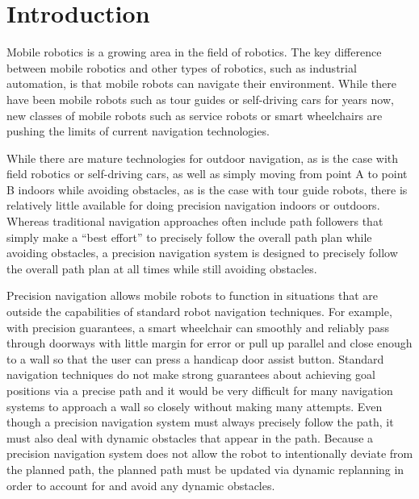 \section{Introduction}\label{sec:introduction}

Mobile robotics is a growing area in the field of robotics. The key difference between mobile robotics and other types of robotics, such as industrial automation, is that mobile robots can navigate their environment. While there have been mobile robots such as tour guides or self-driving cars for years now, new classes of mobile robots such as service robots or smart wheelchairs are pushing the limits of current navigation technologies.

While there are mature technologies for outdoor navigation, as is the case with field robotics or self-driving cars, as well as simply moving from point A to point B indoors while avoiding obstacles, as is the case with tour guide robots, there is relatively little available for doing precision navigation indoors or outdoors. Whereas traditional navigation approaches often include path followers that simply make a ``best effort'' to precisely follow the overall path plan while avoiding obstacles, a precision navigation system is designed to precisely follow the overall path plan at all times while still avoiding obstacles.

Precision navigation allows mobile robots to function in situations that are outside the capabilities of standard robot navigation techniques. For example, with precision guarantees, a smart wheelchair can smoothly and reliably pass through doorways with little margin for error or pull up parallel and close enough to a wall so that the user can press a handicap door assist button. Standard navigation techniques do not make strong guarantees about achieving goal positions via a precise path and it would be very difficult for many navigation systems to approach a wall so closely without making many attempts. Even though a precision navigation system must always precisely follow the path, it must also deal with dynamic obstacles that appear in the path. Because a precision navigation system does not allow the robot to intentionally deviate from the planned path, the planned path must be updated via dynamic replanning in order to account for and avoid any dynamic obstacles.

